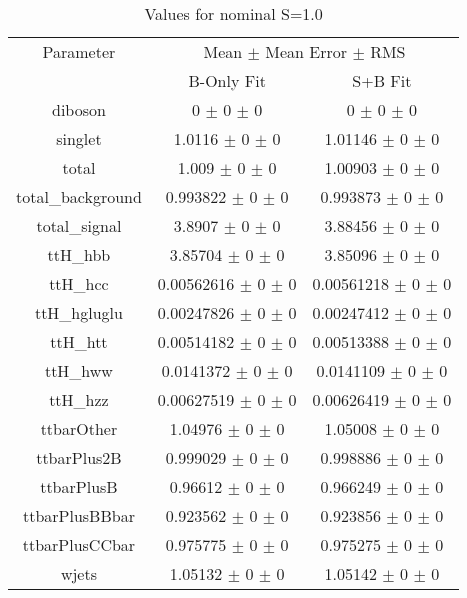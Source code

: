 \begin{table}
\centering
\caption{Values for nominal S=1.0}
\begin{tabular}{ccc}
\toprule
Parameter 	& \multicolumn{2}{c}{Mean $\pm$ Mean Error $\pm$ RMS}\\
 	& B-Only Fit & S+B Fit\\
\midrule
diboson 	& \num{0} $\pm$ \num{0} $\pm$ \num{0} 	& \num{0} $\pm$ \num{0} $\pm$ \num{0}\\
singlet 	& \num{1.0116} $\pm$ \num{0} $\pm$ \num{0} 	& \num{1.01146} $\pm$ \num{0} $\pm$ \num{0}\\
total 	& \num{1.009} $\pm$ \num{0} $\pm$ \num{0} 	& \num{1.00903} $\pm$ \num{0} $\pm$ \num{0}\\
total\_background 	& \num{0.993822} $\pm$ \num{0} $\pm$ \num{0} 	& \num{0.993873} $\pm$ \num{0} $\pm$ \num{0}\\
total\_signal 	& \num{3.8907} $\pm$ \num{0} $\pm$ \num{0} 	& \num{3.88456} $\pm$ \num{0} $\pm$ \num{0}\\
ttH\_hbb 	& \num{3.85704} $\pm$ \num{0} $\pm$ \num{0} 	& \num{3.85096} $\pm$ \num{0} $\pm$ \num{0}\\
ttH\_hcc 	& \num{0.00562616} $\pm$ \num{0} $\pm$ \num{0} 	& \num{0.00561218} $\pm$ \num{0} $\pm$ \num{0}\\
ttH\_hgluglu 	& \num{0.00247826} $\pm$ \num{0} $\pm$ \num{0} 	& \num{0.00247412} $\pm$ \num{0} $\pm$ \num{0}\\
ttH\_htt 	& \num{0.00514182} $\pm$ \num{0} $\pm$ \num{0} 	& \num{0.00513388} $\pm$ \num{0} $\pm$ \num{0}\\
ttH\_hww 	& \num{0.0141372} $\pm$ \num{0} $\pm$ \num{0} 	& \num{0.0141109} $\pm$ \num{0} $\pm$ \num{0}\\
ttH\_hzz 	& \num{0.00627519} $\pm$ \num{0} $\pm$ \num{0} 	& \num{0.00626419} $\pm$ \num{0} $\pm$ \num{0}\\
ttbarOther 	& \num{1.04976} $\pm$ \num{0} $\pm$ \num{0} 	& \num{1.05008} $\pm$ \num{0} $\pm$ \num{0}\\
ttbarPlus2B 	& \num{0.999029} $\pm$ \num{0} $\pm$ \num{0} 	& \num{0.998886} $\pm$ \num{0} $\pm$ \num{0}\\
ttbarPlusB 	& \num{0.96612} $\pm$ \num{0} $\pm$ \num{0} 	& \num{0.966249} $\pm$ \num{0} $\pm$ \num{0}\\
ttbarPlusBBbar 	& \num{0.923562} $\pm$ \num{0} $\pm$ \num{0} 	& \num{0.923856} $\pm$ \num{0} $\pm$ \num{0}\\
ttbarPlusCCbar 	& \num{0.975775} $\pm$ \num{0} $\pm$ \num{0} 	& \num{0.975275} $\pm$ \num{0} $\pm$ \num{0}\\
wjets 	& \num{1.05132} $\pm$ \num{0} $\pm$ \num{0} 	& \num{1.05142} $\pm$ \num{0} $\pm$ \num{0}\\
\bottomrule
\end{tabular}
\end{table}
